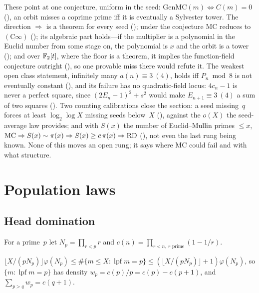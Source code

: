 \documentclass[10pt,a4paper]{article}
\newcommand{\lpf}{\operatorname{lpf}}
\newcommand{\RD}{\mathrm{RD}}
\newcommand{\Cinf}{(\mathrm{C}\infty)}
\begin{document}
These point at one conjecture, uniform in the seed: $\mathrm{GenMC}(m)\iff
C(m)=0$ (), an orbit
misses a coprime prime iff it is eventually a Sylvester tower.  The
direction $\Rightarrow$ is a theorem for every seed
(); under
the conjecture MC reduces to $\Cinf$
(); its algebraic part
holds---if the multiplier is a polynomial in the Euclid number from some
stage on, the polynomial is $x$ and the orbit is a tower
();
and over $\mathbb{F}_2[t]$, where the floor is a theorem, it implies the
function-field conjecture outright
(), so one
provable miss there would refute it.  The weakest open class statement,
infinitely many $a(n)\equiv3\ (4)$, holds iff $P_n\bmod 8$ is not eventually
constant
(),
and its failure has no quadratic-field locus: $4c_n-1$ is never a perfect
square, since $(2E_n-1)^2+s^2$ would make $E_{n+1}\equiv3\ (4)$ a sum of two
squares
().
Two counting calibrations close the section: a seed missing~$q$ forces at
least $\log_2\log X$ missing seeds below~$X$
(), against the
$o(X)$ the seed-average law provides; and with $S(x)$ the number of
Euclid--Mullin primes $\le x$, $\MC\Rightarrow S(x)\sim\pi(x)\Rightarrow
S(x)\ge c\,\pi(x)\Rightarrow\RD$
(), not even the
last rung being known.  None of this moves an open rung; it says where MC
could fail and with what structure.

\section{Population laws}
\label{sec:population}

\subsection{Head domination}
\label{sec:headdom}

For a prime~$p$ let $N_p=\prod_{r<p}r$ and $c(n)=\prod_{r<n,\ r\text{ prime}}(1-1/r)$.

\begin{theorem}
$\lfloor X/(pN_p)\rfloor\varphi(N_p)\le\#\{m\le X:\lpf m=p\}\le
(\lfloor X/(pN_p)\rfloor+1)\varphi(N_p)$, so $\{m:\lpf m=p\}$ has density
$w_p=c(p)/p=c(p)-c(p{+}1)$, and $\sum_{p>q}w_p=c(q{+}1)$.
\end{theorem}
\end{document}
